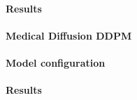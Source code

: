 \paragraph{Results}

\newpage
\paragraph{Medical Diffusion DDPM}
\paragraph{Model configuration}



\paragraph{Results}
